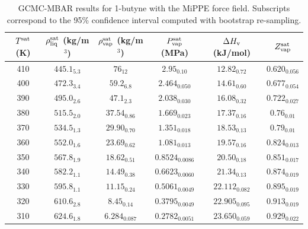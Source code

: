 \documentclass[journal=jctc,manuscript=article]{achemso}
\begin{document}
\begin{table}[htb!]
	\caption{GCMC-MBAR results for 1-butyne with the MiPPE force field. Subscripts correspond to the 95\% confidence interval computed with bootstrap re-sampling.}
	\begin{center}
		\begin{tabular}{|c|c|c|c|c|c|}
			\hline
			$T^{\rm sat}$ (K) & $\rho_{\rm liq}^{\rm sat}$ (kg/m$^3$) & $\rho_{\rm vap}^{\rm sat}$ (kg/m$^3$) & $P_{\rm vap}^{\rm sat}$ (MPa) & $\Delta H_{\rm v}$ (kJ/mol) & $Z_{\rm vap}^{\rm sat}$ \\ \hline
			410 & $445.1_{5.3}$ & $76_{12}$ & $2.95_{0.10}$ & $12.82_{0.72}$ & $0.620_{0.056}$ \\
			400 & $472.3_{3.4}$ & $59.2_{6.8}$ & $2.464_{0.050}$ & $14.61_{0.60}$ & $0.677_{0.054}$ \\
			390 & $495.0_{2.6}$ & $47.1_{2.3}$ & $2.038_{0.030}$ & $16.08_{0.32}$ & $0.722_{0.027}$ \\
			380 & $515.5_{2.0}$ & $37.54_{0.86}$ & $1.669_{0.023}$ & $17.37_{0.16}$ & $0.76_{0.01}$ \\
			370 & $534.5_{1.3}$ & $29.90_{0.70}$ & $1.351_{0.018}$ & $18.53_{0.13}$ & $0.79_{0.01}$ \\
			360 & $552.0_{1.6}$ & $23.69_{0.62}$ & $1.081_{0.013}$ & $19.57_{0.16}$ & $0.824_{0.013}$ \\
			350 & $567.8_{1.9}$ & $18.62_{0.51}$ & $0.8524_{0.0086}$ & $20.50_{0.18}$ & $0.851_{0.017}$ \\
			340 & $582.2_{1.1}$ & $14.49_{0.38}$ & $0.6623_{0.0060}$ & $21.34_{0.13}$ & $0.874_{0.019}$ \\
			330 & $595.8_{1.1}$ & $11.15_{0.24}$ & $0.5061_{0.0049}$ & $22.112_{0.082}$ & $0.895_{0.019}$ \\
			320 & $610.6_{2.8}$ & $8.45_{0.14}$ & $0.3795_{0.0049}$ & $22.905_{0.095}$ & $0.913_{0.019}$ \\
			310 & $624.6_{1.8}$ & $6.284_{0.087}$ & $0.2782_{0.0051}$ & $23.650_{0.059}$ & $0.929_{0.022}$ \\
			\hline
		\end{tabular}
	\end{center}
\end{table}
\end{document}

